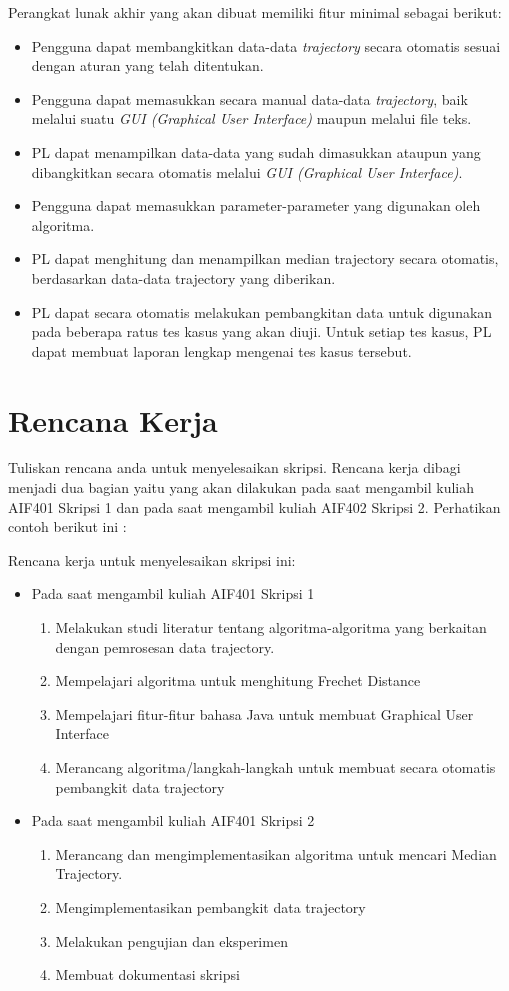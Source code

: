 \documentclass[a4paper,twoside]{article}
\begin{document}
Perangkat lunak akhir yang akan dibuat memiliki fitur minimal sebagai berikut:
\begin{itemize}
	\item Pengguna dapat membangkitkan data-data {\it trajectory} secara otomatis sesuai dengan aturan yang telah ditentukan.
	\item Pengguna dapat memasukkan secara manual data-data {\it trajectory}, baik melalui suatu {\it GUI (Graphical User Interface)} maupun melalui file teks. 
	\item PL dapat menampilkan data-data yang sudah dimasukkan ataupun yang dibangkitkan secara otomatis melalui {\it GUI (Graphical User Interface)}.
	\item Pengguna dapat memasukkan parameter-parameter yang digunakan oleh algoritma.
	\item PL dapat menghitung dan menampilkan median trajectory secara otomatis, berdasarkan data-data trajectory yang diberikan.
	\item PL dapat secara otomatis melakukan pembangkitan data untuk digunakan pada beberapa ratus tes kasus yang akan diuji. Untuk setiap tes kasus, PL dapat membuat laporan lengkap mengenai tes kasus tersebut.
\end{itemize}

\section{Rencana Kerja}
Tuliskan rencana anda untuk menyelesaikan skripsi. Rencana kerja dibagi menjadi dua bagian yaitu yang akan dilakukan pada saat mengambil kuliah AIF401 Skripsi 1 dan pada saat mengambil kuliah AIF402 Skripsi 2. Perhatikan contoh berikut ini :

Rencana kerja untuk menyelesaikan skripsi ini:
\begin{itemize}
	\item Pada saat mengambil kuliah AIF401 Skripsi 1
	\begin{enumerate}
		\item Melakukan studi literatur tentang algoritma-algoritma yang berkaitan dengan pemrosesan data trajectory.
		\item Mempelajari algoritma untuk menghitung Frechet Distance
		\item Mempelajari fitur-fitur bahasa Java untuk membuat Graphical User Interface
		\item Merancang algoritma/langkah-langkah untuk membuat secara otomatis pembangkit data trajectory
	\end{enumerate}
	\item Pada saat mengambil kuliah AIF401 Skripsi 2
	\begin{enumerate}
		\item Merancang dan mengimplementasikan algoritma untuk mencari Median Trajectory.
		\item Mengimplementasikan pembangkit data trajectory 
		\item Melakukan pengujian dan eksperimen
		\item Membuat dokumentasi skripsi
	\end{enumerate}
\end{itemize}
\end{document}
